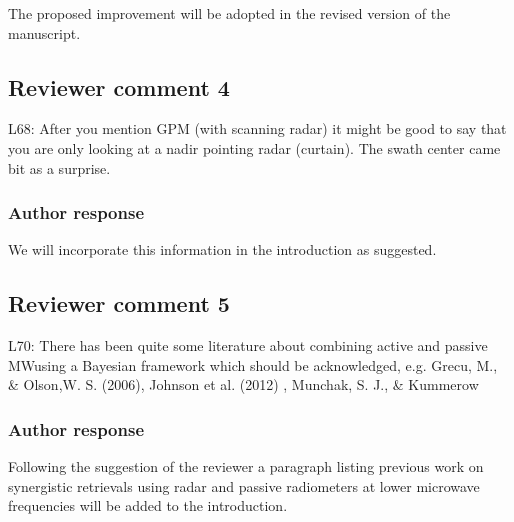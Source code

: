 \documentclass[11pt]{scrartcl}
\begin{document}
The proposed improvement will be adopted in the revised version of the manuscript.



\textit{}

\subsection*{Reviewer comment 4}

L68:  After you mention GPM (with scanning radar) it might be good to say that you are only looking at a nadir pointing radar (curtain).  The swath center came bit as a surprise.

\subsubsection*{Author response}

We will incorporate this information in the introduction as suggested.

%

\subsection*{Reviewer comment 5}

L70: There has been quite some literature about combining active and passive
MWusing a Bayesian framework which should be acknowledged, e.g. Grecu, M., \&
Olson,W. S. (2006), Johnson et al. (2012) , Munchak, S. J., \& Kummerow

\subsubsection*{Author response}

Following the suggestion of the reviewer a paragraph listing  previous work
on synergistic retrievals using radar and passive radiometers at lower microwave
frequencies will be added to the introduction.

%
%
%
\end{document}
